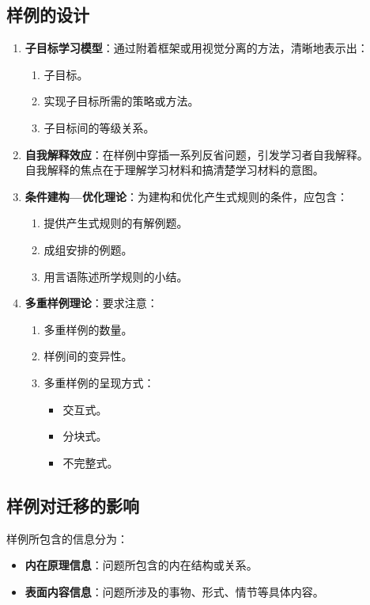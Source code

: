 \subsection*{样例的设计}
\begin{multicols}{2}
\begin{enumerate}
    \item \textbf{子目标学习模型}：通过附着框架或用视觉分离的方法，清晰地表示出：
    \begin{enumerate}
        \item 子目标。
        \item 实现子目标所需的策略或方法。
        \item 子目标间的等级关系。
    \end{enumerate}
    
    \item \textbf{自我解释效应}：在样例中穿插一系列反省问题，引发学习者自我解释。\\
    自我解释的焦点在于理解学习材料和搞清楚学习材料的意图。
\columnbreak
    \item \textbf{条件建构—优化理论}：为建构和优化产生式规则的条件，应包含：
    \begin{enumerate}
        \item 提供产生式规则的有解例题。
        \item 成组安排的例题。
        \item 用言语陈述所学规则的小结。
    \end{enumerate}

    \item \textbf{多重样例理论}：要求注意：
    \begin{enumerate}
        \item 多重样例的数量。
        \item 样例间的变异性。
        \item 多重样例的呈现方式：
        \begin{itemize}
            \item 交互式。
            \item 分块式。
            \item 不完整式。
        \end{itemize}
    \end{enumerate}
\end{enumerate}
\end{multicols}

\subsection{样例对迁移的影响}
样例所包含的信息分为：
\begin{itemize}
    \item \textbf{内在原理信息}：问题所包含的内在结构或关系。
    \item \textbf{表面内容信息}：问题所涉及的事物、形式、情节等具体内容。
\end{itemize}

